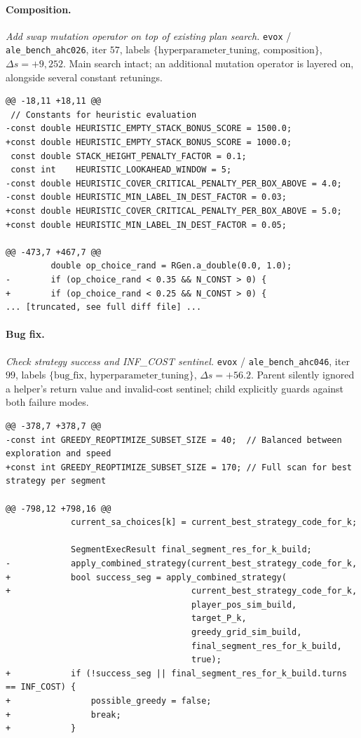\paragraph{Composition.}
\textit{Add swap mutation operator on top of existing plan search.} \texttt{evox} / \texttt{ale\_bench\_ahc026}, iter $57$, labels $\{\text{hyperparameter\_tuning},\,\text{composition}\}$, $\Delta s = +9{,}252$. Main search intact; an additional mutation operator is layered on, alongside several constant retunings.
{\scriptsize
\begin{verbatim}
@@ -18,11 +18,11 @@
 // Constants for heuristic evaluation
-const double HEURISTIC_EMPTY_STACK_BONUS_SCORE = 1500.0;
+const double HEURISTIC_EMPTY_STACK_BONUS_SCORE = 1000.0;
 const double STACK_HEIGHT_PENALTY_FACTOR = 0.1;
 const int    HEURISTIC_LOOKAHEAD_WINDOW = 5;
-const double HEURISTIC_COVER_CRITICAL_PENALTY_PER_BOX_ABOVE = 4.0;
-const double HEURISTIC_MIN_LABEL_IN_DEST_FACTOR = 0.03;
+const double HEURISTIC_COVER_CRITICAL_PENALTY_PER_BOX_ABOVE = 5.0;
+const double HEURISTIC_MIN_LABEL_IN_DEST_FACTOR = 0.05;

@@ -473,7 +467,7 @@
         double op_choice_rand = RGen.a_double(0.0, 1.0);
-        if (op_choice_rand < 0.35 && N_CONST > 0) {
+        if (op_choice_rand < 0.25 && N_CONST > 0) {
... [truncated, see full diff file] ...
\end{verbatim}
}

\paragraph{Bug fix.}
\textit{Check strategy success and INF\_COST sentinel.} \texttt{evox} / \texttt{ale\_bench\_ahc046}, iter $99$, labels $\{\text{bug\_fix},\,\text{hyperparameter\_tuning}\}$, $\Delta s = +56.2$. Parent silently ignored a helper's return value and invalid-cost sentinel; child explicitly guards against both failure modes.
{\scriptsize
\begin{verbatim}
@@ -378,7 +378,7 @@
-const int GREEDY_REOPTIMIZE_SUBSET_SIZE = 40;  // Balanced between exploration and speed
+const int GREEDY_REOPTIMIZE_SUBSET_SIZE = 170; // Full scan for best strategy per segment

@@ -798,12 +798,16 @@
             current_sa_choices[k] = current_best_strategy_code_for_k;

             SegmentExecResult final_segment_res_for_k_build;
-            apply_combined_strategy(current_best_strategy_code_for_k,
+            bool success_seg = apply_combined_strategy(
+                                    current_best_strategy_code_for_k,
                                     player_pos_sim_build,
                                     target_P_k,
                                     greedy_grid_sim_build,
                                     final_segment_res_for_k_build,
                                     true);
+            if (!success_seg || final_segment_res_for_k_build.turns == INF_COST) {
+                possible_greedy = false;
+                break;
+            }
\end{verbatim}
}

